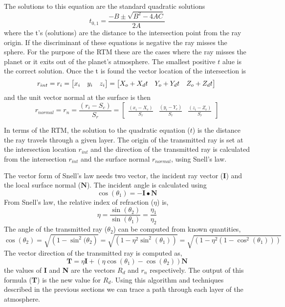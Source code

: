 The solutions to this equation are the standard quadratic solutions
\begin{equation}
t_{0,1} = \frac{-B\pm\sqrt{B^2-4AC}}{2A}
\end{equation}
where the t's (solutions) are the distance to the intersection point from the ray origin. If the discriminant of these equations is negative the ray misses the sphere. For the purpose of the RTM these are the cases where the ray misses the planet or it exits out of the planet's atmosphere. The smallest positive $t$ alue is the correct solution. Once the t is found the vector location of the intersection is
\begin{equation}
r_{int} = r_i = \left[ \begin{matrix} x_i&y_i&z_i \end{matrix}\right] = \left[ \begin{matrix} X_o + X_dt&Y_o + Y_dt&Z_o + Z_dt \end{matrix}\right]\\
\end{equation}
and the unit vector normal at the surface is then
\begin{equation}
r_{normal} = r_n = \frac{(r_i-S_c)}{S_r} =\left[ \begin{matrix} \frac{(x_i-X_c)}{S_r} &\frac{(y_i-Y_c)}{S_r} & \frac{(z_i-Z_c)}{S_r} \end{matrix}\right]
\end{equation}

In terms of the RTM, the solution to the quadratic equation ($t$) is the distance the ray travels through a given layer. The origin of the transmitted ray is set at the intersection location $r_{int}$ and the direction of the transmitted ray is calculated from the intersection $r_{int}$ and the surface normal $r_{normal}$, using Snell's law.

The vector form of Snell's law needs two vector, the incident ray vector ($\textbf{I}$) and the local surface normal ($\textbf{N}$). The incident angle is calculated using
\begin{equation}
\cos (\theta_1) = -\textbf{I} \bullet \textbf{N}
\end{equation}
From Snell's law, the relative index of refraction ($\eta$) is,
\begin{equation}
\eta = \frac{\sin (\theta_2)}{\sin(\theta_1)} = \frac{\eta_1}{\eta_2}
\end{equation}
The angle of the transmitted ray ($\theta_2$) can be computed from known quantities,
\begin{equation}
\cos(\theta_2) = \sqrt{\left(1-\sin^2(\theta_2\right)}= \sqrt{\left(1-\eta^2\sin^2(\theta_1)\right)} =  \sqrt{\left(1-\eta^2(1-\cos^2(\theta_1))\right)}
\end{equation}
The vector direction of the transmitted ray is computed as,
\begin{equation}
\textbf{T} = \eta\textbf{I} + (\eta\cos(\theta_1) -\cos (\theta_2))\textbf{N}
\end{equation}
the values of \textbf{I} and \textbf{N} are the vectors $R_d$ and $r_n$ respectively. The output of this formula (\textbf{T}) is the new value for $R_d$. Using this algorithm and techniques described in the previous sections we can trace a path through each layer of the atmosphere.